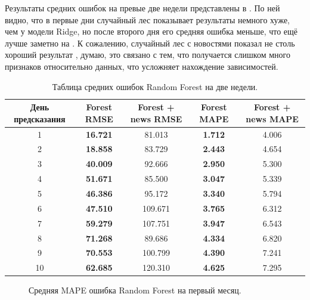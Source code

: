 \documentclass[12pt, a4paper]{article}
\begin{document}
Результаты средних ошибок на превые две недели представлены в . По ней видно, что в первые дни случайный лес показывает результаты немного хуже, чем у модели Ridge, но после второго дня его средняя ошибка меньше, что ещё лучше заметно на . К сожалению, случайный лес с новостями показал не столь хороший результат , думаю, это связано с тем, что получается слишком много признаков относительно данных, что усложняет нахождение зависимостей.
\begin{table}[H]
\centering
\caption{Таблица средних ошибок Random Forest на две недели.}
\begin{tabular}{ |c|c|c|c|c| } 
 \hline
 День предсказания & Forest RMSE & Forest + news RMSE & Forest MAPE & Forest + news MAPE \\ 
 \hline
1 & \textbf{16.721} & 81.013 & \textbf{1.712} & 4.006 \\ 
 \hline
2 & \textbf{18.858} & 83.729 & \textbf{2.443} & 4.654 \\ 
 \hline
3 & \textbf{40.009} & 92.666 & \textbf{2.950} & 5.300 \\ 
 \hline
4 & \textbf{51.671} & 85.500 & \textbf{3.047} & 5.339 \\ 
 \hline
5 & \textbf{46.386} & 95.172 & \textbf{3.340} & 5.794 \\ 
 \hline
6 & \textbf{47.510} & 109.671 & \textbf{3.765} & 6.312 \\ 
 \hline
7 & \textbf{59.279} & 107.751 & \textbf{3.947} & 6.543 \\ 
 \hline
8 & \textbf{71.268} & 89.686 & \textbf{4.334} & 6.820 \\ 
 \hline
9 & \textbf{70.553} & 100.799 & \textbf{4.390} & 7.241 \\ 
 \hline
10 & \textbf{62.685} & 120.310 & \textbf{4.625} & 7.295 \\ 
 \hline
\end{tabular}
\label{tab:random_forest}
\end{table}
\begin{figure}[h!]
\caption{Средняя MAPE ошибка Random Forest на первый месяц.}
\label{fig:random_forest}
\end{figure}
\end{document}

